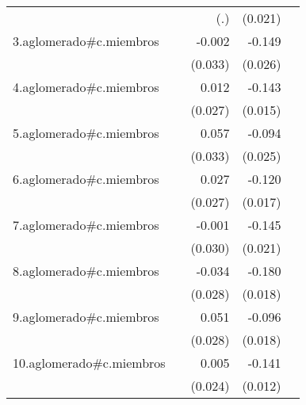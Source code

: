 {\begin{longtable}{l*{4}{D{.}{.}{-1}}}
            &                     &         (.)         &     (0.021)         &                     \\
\addlinespace
3.aglomerado#c.miembros&                     &      -0.002         &      -0.149\sym{***}&                     \\
            &                     &     (0.033)         &     (0.026)         &                     \\
\addlinespace
4.aglomerado#c.miembros&                     &       0.012         &      -0.143\sym{***}&                     \\
            &                     &     (0.027)         &     (0.015)         &                     \\
\addlinespace
5.aglomerado#c.miembros&                     &       0.057         &      -0.094\sym{***}&                     \\
            &                     &     (0.033)         &     (0.025)         &                     \\
\addlinespace
6.aglomerado#c.miembros&                     &       0.027         &      -0.120\sym{***}&                     \\
            &                     &     (0.027)         &     (0.017)         &                     \\
\addlinespace
7.aglomerado#c.miembros&                     &      -0.001         &      -0.145\sym{***}&                     \\
            &                     &     (0.030)         &     (0.021)         &                     \\
\addlinespace
8.aglomerado#c.miembros&                     &      -0.034         &      -0.180\sym{***}&                     \\
            &                     &     (0.028)         &     (0.018)         &                     \\
\addlinespace
9.aglomerado#c.miembros&                     &       0.051         &      -0.096\sym{***}&                     \\
            &                     &     (0.028)         &     (0.018)         &                     \\
\addlinespace
10.aglomerado#c.miembros&                     &       0.005         &      -0.141\sym{***}&                     \\
            &                     &     (0.024)         &     (0.012)         &                     \\

\end{longtable}}
